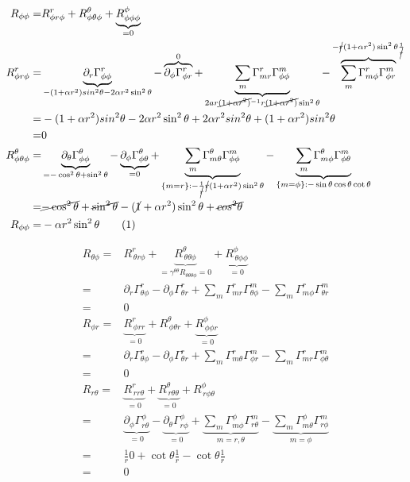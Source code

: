 \documentclass[]{article}
\newcommand\numberthis{\addtocounter{equation}{1}\tag{\theequation}}
\begin{document}
\begin{align*}
R_{\phi\phi}=& R^r_{\phi r \phi} + R^{\theta}_{\phi\theta\phi}+\underbrace{R^{\phi}_{\phi\phi\phi}}_{=0}\\
R^r_{\phi r \phi}=&\underbrace{\partial_r \Gamma^r_{\phi\phi}}_{-(1+\alpha r^2)sin^2 \theta-2\alpha r^2 \sin^2 \theta}-\overbrace{\partial_{\phi}\Gamma^{r}_{\phi r}}^{0} +\underbrace{\sum_m\Gamma^r_{mr}\Gamma^m_{\phi\phi}}_{2ar\cancel{(1+\alpha r^2)}^{-1}r\cancel{(1+\alpha r^2)}\sin^2 \theta}-\overbrace{\sum_m\Gamma^r_{m\phi}\Gamma^m_{\phi r}}^{-\cancel{r}(1+\alpha r^2)\sin^2\theta\frac{1}{\cancel{r}}}\\
=&-(1+\alpha r^2)sin^2 \theta-2\alpha r^2 \sin^2 \theta+2\alpha r^2 sin^2\theta + (1+\alpha r^2) sin^2\theta\\
=&0\\
R^{\theta}_{\phi\theta\phi}=&\underbrace{\partial_\theta\Gamma^{\theta}_{\phi\phi}}_{=-\cos^2\theta+\sin^2\theta}-\underbrace{\partial_{\phi}\Gamma^{\theta}_{\phi\theta}}_{=0} + \underbrace{\sum_m\Gamma^{\theta}_{m\theta}\Gamma^m_{\phi\phi}}_{\{m=r\}: -\frac{1}{\cancel{r}}\cancel{r}(1+\alpha r^2)\sin^2\theta}-\underbrace{\sum_m\Gamma^{\theta}_{m\phi}\Gamma^m_{\phi\theta}}_{\{m=\phi\}:-\sin\theta\cos\theta\cot\theta}\\
=&\cancel{-\cos^2\theta}+\cancel{\sin^2\theta}-(\cancel{1}+\alpha r^2)\sin^2\theta+\cancel{cos^2\theta}\\
R_{\phi\phi}=& -\alpha r^2 \sin^2\theta \numberthis\label{eq:R-phi-phi}
\end{align*}

\begin{align*}
R_{\theta\phi}=&R^r_{\,\theta r \phi}+\underbrace{R^{\theta}_{\,\theta\theta\phi}}_{=\gamma^{\theta\theta}R_{\theta\theta\theta\phi}=0}+\underbrace{R^{\phi}_{\,\theta\phi\phi}}_{=0}\\
=&\partial_r\Gamma^r_{\theta\phi}-\partial_{\phi}\Gamma^r_{\theta r}+\sum_m\Gamma^r_{mr}\Gamma^m_{\theta\phi}-\sum_m\Gamma^r_{m\phi}\Gamma^m_{\theta r}\\
=&0\\
R_{\phi r}=&\underbrace{R^r_{\,\phi rr}}_{=0} + R^{\theta}_{\,\phi\theta r} + \underbrace{R^{\phi}_{\,\phi\phi r}}_{=0}\\
=&\partial_r \Gamma^r_{\theta\phi} - \partial_{\phi} \Gamma^r_{\theta r} + \sum_m\Gamma^r_{m\theta} \Gamma^m_{\phi r} - \sum_m\Gamma^r_{mr} \Gamma^m_{\phi \theta} \\
=& 0\\
R_{r\theta}=&\underbrace{R^r_{\,rr \theta}}_{=0} + \underbrace{R^{\theta}_{\,r\theta\theta}}_{=0} + R^{\phi}_{\,r\phi\theta}\\
=&\underbrace{\partial_{\phi} \Gamma^{\phi}_{r\theta}}_{=0} - \underbrace{\partial_{\theta} \Gamma^{\phi}_{r\phi}}_{=0} + \underbrace{\sum_m\Gamma^{\phi}_{m\phi} \Gamma^m_{r\theta}}_{m=r,\theta} - \underbrace{\sum_m\Gamma^{\phi}_{m\theta} \Gamma^m_{r\phi}}_{m=\phi} \\
=&\frac{1}{r}0 + \cot\theta\frac{1}{r}-\cot\theta\frac{1}{r}\\
=&0
\end{align*}
\end{document}
